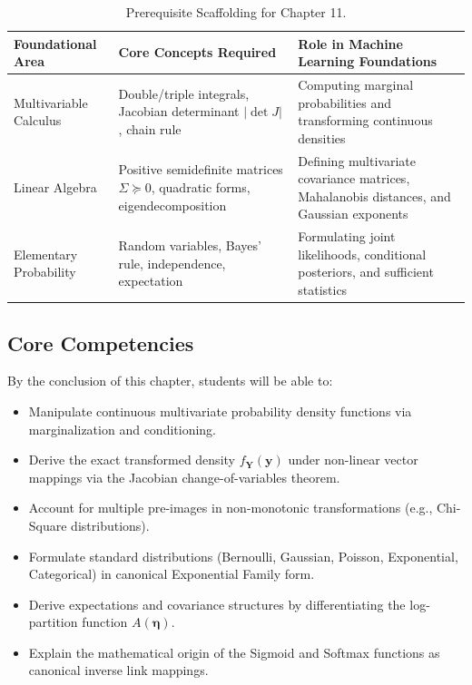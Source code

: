 \begin{table}[htbp]
\centering
\small
\begin{tabularx}{\textwidth}{lXX}
\toprule
\textbf{Foundational Area} & \textbf{Core Concepts Required} & \textbf{Role in Machine Learning Foundations} \\
\midrule
Multivariable Calculus & Double/triple integrals, Jacobian determinant $|\det J|$, chain rule & Computing marginal probabilities and transforming continuous densities \\
Linear Algebra & Positive semidefinite matrices $\Sigma \succeq 0$, quadratic forms, eigendecomposition & Defining multivariate covariance matrices, Mahalanobis distances, and Gaussian exponents \\
Elementary Probability & Random variables, Bayes' rule, independence, expectation & Formulating joint likelihoods, conditional posteriors, and sufficient statistics \\
\bottomrule
\end{tabularx}
\caption{Prerequisite Scaffolding for Chapter 11.}
\label{tab:w11_prereqs}
\end{table}

\subsection{Core Competencies}
By the conclusion of this chapter, students will be able to:
\begin{itemize}
    \item Manipulate continuous multivariate probability density functions via marginalization and conditioning.
    \item Derive the exact transformed density $f_{\mathbf{Y}}(\mathbf{y})$ under non-linear vector mappings via the Jacobian change-of-variables theorem.
    \item Account for multiple pre-images in non-monotonic transformations (e.g., Chi-Square distributions).
    \item Formulate standard distributions (Bernoulli, Gaussian, Poisson, Exponential, Categorical) in canonical Exponential Family form.
    \item Derive expectations and covariance structures by differentiating the log-partition function $A(\boldsymbol{\eta})$.
    \item Explain the mathematical origin of the Sigmoid and Softmax functions as canonical inverse link mappings.
\end{itemize}

